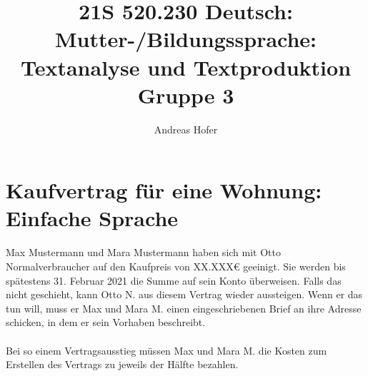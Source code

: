 \documentclass{article}
\title{\vspace{-3cm}21S 520.230 Deutsch: Mutter-/Bildungssprache: Textanalyse und Textproduktion Gruppe 3}
\author{Andreas Hofer}
\begin{document}
	\section*{Kaufvertrag für eine Wohnung: Einfache Sprache}
	Max Mustermann und Mara Mustermann haben sich mit Otto Normalverbraucher auf den Kaufpreis von XX.XXX€ geeinigt. Sie werden bis spätestens 31. Februar 2021 die Summe auf sein Konto überweisen. Falls das nicht geschieht, kann Otto N. aus diesem Vertrag wieder aussteigen. Wenn er das tun will, muss er Max und Mara M. einen eingeschriebenen Brief an ihre Adresse schicken, in dem er sein Vorhaben beschreibt. \\ \\
	Bei so einem Vertragsausstieg müssen Max und Mara M. die Kosten zum Erstellen des Vertrags zu jeweils der Hälfte bezahlen. \\
	
\end{document}

